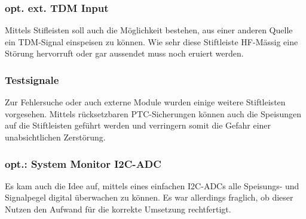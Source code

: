 \subsubsection{opt. ext. TDM Input}
Mittels Stifleisten soll auch die Möglichkeit bestehen, aus einer anderen Quelle ein TDM-Signal einspeisen zu können. Wie sehr diese Stiftleiste HF-Mässig eine Störung hervorruft oder gar aussendet muss noch eruiert werden.
\subsubsection{Testsignale}
Zur Fehlersuche oder auch externe Module wurden einige weitere Stiftleisten vorgesehen. Mittels rücksetzbaren PTC-Sicherungen können auch die Speisungen auf die Stiftleisten geführt werden und verringern somit die Gefahr einer unabsichtlichen Zerstörung.
\subsubsection{opt.: System Monitor I2C-ADC}
Es kam auch die Idee auf, mittels eines einfachen I2C-ADCs alle Speisungs- und Signalpegel digital überwachen zu können. Es war allerdings fraglich, ob dieser Nutzen den Aufwand für die korrekte Umsetzung rechtfertigt.